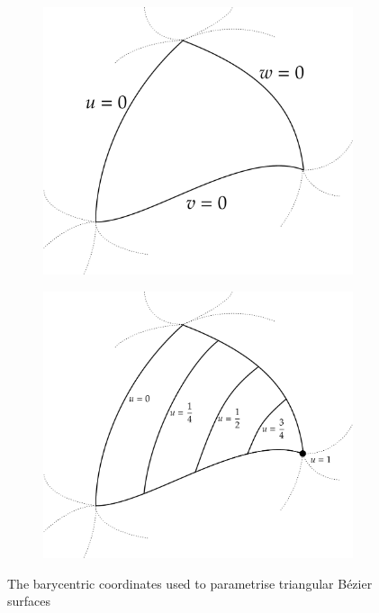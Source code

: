 \begin{figure}
\centering
\begin{subfigure}{0.4\linewidth}
\includegraphics[width=\linewidth]{figs/triangle1}
\caption{}%
\label{subfig:triangle1}
\end{subfigure}%
\begin{subfigure}{0.4\linewidth}
\includegraphics[width=\linewidth]{figs/triangle2}
\caption{}%
\label{subfig:triangle2}
\end{subfigure}%
\caption{The barycentric coordinates used to parametrise triangular B\'ezier surfaces}%
\label{fig:triangle}
\end{figure}

